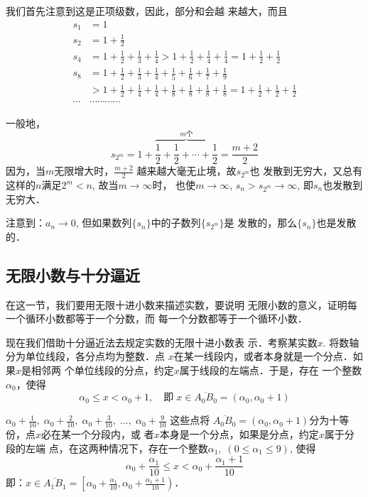 \begin{solution}
    我们首先注意到这是正项级数，因此，部分和会越
来越大，而且
\[\begin{split}
    s_1&=1          \\
    s_2&=1+\frac{1}{2}          \\
    s_4&=1+\frac{1}{2}+\frac{1}{3}+\frac{1}{4}>1+\frac{1}{2}+\frac{1}{4}+\frac{1}{4}=1+\frac{1}{2}+\frac{1}{2}          \\
    s_8&=1+\frac{1}{2}+\frac{1}{3}+\frac{1}{4}+\frac{1}{5}+\frac{1}{6}+\frac{1}{7}+\frac{1}{9}          \\
    &>1+\frac{1}{2}+\frac{1}{4}+\frac{1}{4}+\frac{1}{8}+\frac{1}{8}+\frac{1}{8}+\frac{1}{8}=1+\frac{1}{2}+\frac{1}{2}+\frac{1}{2}\\
    \cdots &\cdots \cdots \cdots \cdots 
\end{split}\]

一般地，
\[s_{2^m}=1+\overbrace{\frac{1}{2}+\frac{1}{2}+\cdots +\frac{1}{2}}^{\text{$m$个}}=\frac{m+2}{2}\]    
因为，当$m$无限增大时，$\frac{m+2}{2}$
越来越大毫无止境，故$s_{2^m}$也
发散到无穷大，又总有这样的$n$满足$2^m<n$, 故当$m\to\infty$时，
也使$m\to\infty$, $s_n>s_{2^m}\to \infty$, 即$s_n$也发散到无穷大．

注意到：$a_n\to 0$, 但如果数列$\{s_n\}$中的子数列$\{s_{2^m}\}$是
发散的，那么$\{s_n\}$也是发散的．
\end{solution}

\subsection{无限小数与十分逼近}
在这一节，我们要用无限十进小数来描述实数，要说明
无限小数的意义，证明每一个循环小数都等于一个分数，而
每一个分数都等于一个循环小数．

现在我们借助十分逼近法去规定实数的无限十进小数表
示．考察某实数$x$. 将数轴分为单位线段，各分点均为整数．点
$x$在某一线段内，或者本身就是一个分点．如果$x$是相邻两
个单位线段的分点，约定$x$属于线段的左端点．于是，存在
一个整数$\alpha_0$，使得
\[\alpha_0\le x<\alpha_0+1,\quad \text{即}\; x\in \overline{A_0B_0}=(\alpha_0,\alpha_0+1)\]

$\alpha_0+\frac{1}{10},\; \alpha_0+\frac{2}{10},\; \alpha_0+\frac{3}{10},\;\ldots,\; \alpha_0+\frac{9}{10}$
这些点将
$\overline{A_0B_0}=(\alpha_0,\alpha_0+1)$分为十等份，点$x$必在某一个分段内，或
者$x$本身是一个分点，如果是分点，约定$x$属于分段的左端
点，在这两种情况下，存在一个整数$\alpha_1,\; (0\le \alpha_1\le 9)$, 使得
\[\alpha_0+\frac{\alpha_1}{10}\le x<\alpha_0+\frac{\alpha_1+1}{10}\]
即：$x\in\overline{A_1B_1}=\left[\alpha_0+\frac{\alpha_1}{10}, \alpha_0+\frac{\alpha_1+1}{10}\right)$．

